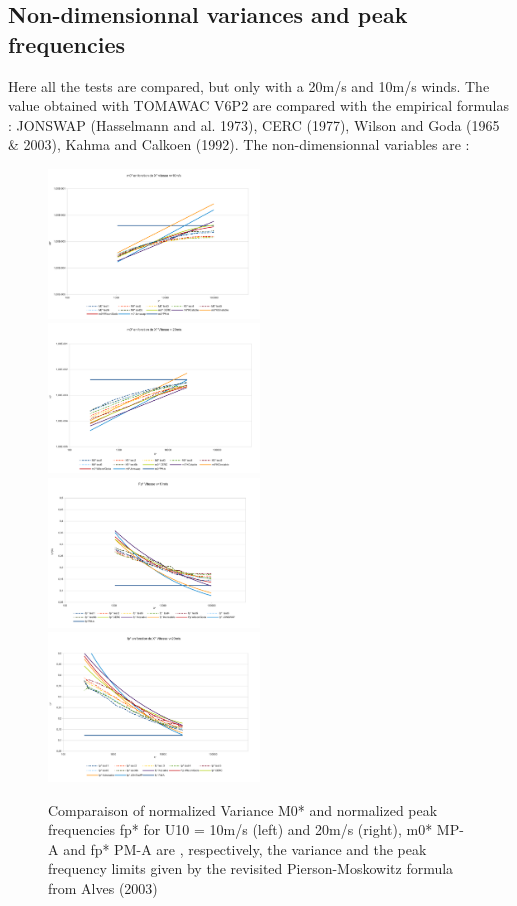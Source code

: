\documentclass[10pt]{article}
\begin{document}
\subsection{Non-dimensionnal variances and peak frequencies}
Here all the tests are compared, but only with a 20m/s and 10m/s winds. The
value obtained with TOMAWAC V6P2 are compared with the empirical formulas :
JONSWAP (Hasselmann and al. 1973), CERC (1977), Wilson and Goda (1965 \& 2003),
Kahma and Calkoen (1992). The non-dimensionnal variables are :\\
\begin{figure}[H]
  \centering
  \includegraphics[width=0.5\textwidth]{M0v10id.pdf}
  \includegraphics[width=0.5\textwidth]{M0v20id.pdf}\\
  \includegraphics[width=0.5\textwidth]{fpv10id.pdf}
  \includegraphics[width=0.5\textwidth]{fpv20id.pdf}\\
  \caption{Comparaison of normalized Variance M0* and normalized peak
    frequencies fp* for U10 = 10m/s (left) and 20m/s (right), m0* MP-A and
    fp* PM-A are , respectively, the variance and the peak frequency limits
    given by the revisited Pierson-Moskowitz formula from Alves (2003)}
\end{figure}
\end{document}
